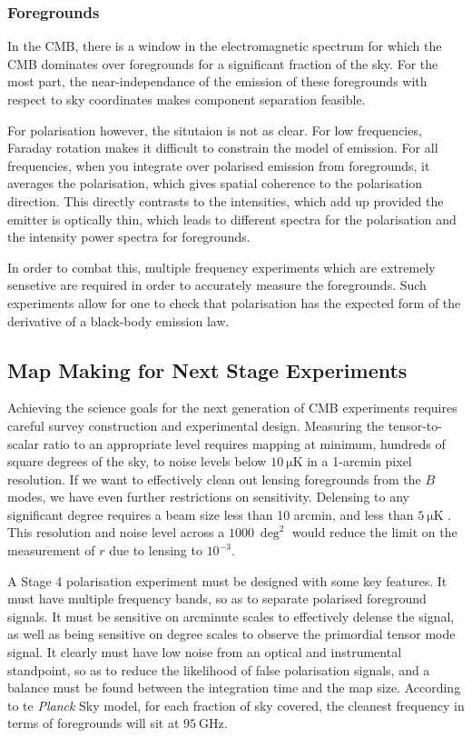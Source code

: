 \subsubsection{Foregrounds}
In the CMB, there is a window in the electromagnetic spectrum for which the CMB dominates over foregrounds for a significant fraction of the sky. For the most part, the near-independance of the emission of these foregrounds with respect to sky coordinates makes component separation feasible.

For polarisation however, the situtaion is not as clear. For low frequencies, Faraday rotation makes it difficult to constrain the model of emission. For all frequencies, when you integrate over polarised emission from foregrounds, it averages the polarisation, which gives spatial coherence to the polarisation direction. This directly contrasts to the intensities, which add up provided the emitter is optically thin, which leads to different spectra for the polarisation and the intensity power spectra for foregrounds.

In order to combat this, multiple frequency experiments which are extremely sensetive are required in order to accurately measure the foregrounds. Such experiments allow for one to check that polarisation has the expected form of the derivative of a black-body emission law.

\subsection{Map Making for Next Stage Experiments}
Achieving the science goals for the next generation of CMB experiments requires careful survey construction and experimental design. Measuring the tensor-to-scalar ratio to an appropriate level requires mapping at minimum, hundreds of square degrees of the sky, to noise levels below $\SI{10}{\micro\kelvin}$ in a 1-arcmin pixel resolution. If we want to effectively clean out lensing foregrounds from the $B$ modes, we have even further restrictions on sensitivity. Delensing to any significant degree requires a beam size less than 10 arcmin, and less than $\SI{5}{\micro\kelvin}$ \cite{0811.3915}. This resolution and noise level across a $\SI{1000}{\deg^2}$ would reduce the limit on the measurement of $r$ due to lensing to $10^{-3}$.

\par A Stage 4 polarisation experiment must be designed with some key features. It must have multiple frequency bands, so as to separate polarised foreground signals. It must be sensitive on arcminute scales to effectively delense the signal, as well as being sensitive on degree scales to observe the primordial tensor mode signal. It clearly must have low noise from an optical and instrumental standpoint, so as to reduce the likelihood of false polarisation signals, and a balance must be found between the integration time and the map size. According to te \textit{Planck} Sky model, for each fraction of sky covered, the cleanest frequency in terms of foregrounds will sit at $\SI{95}{\giga\hertz}$.

